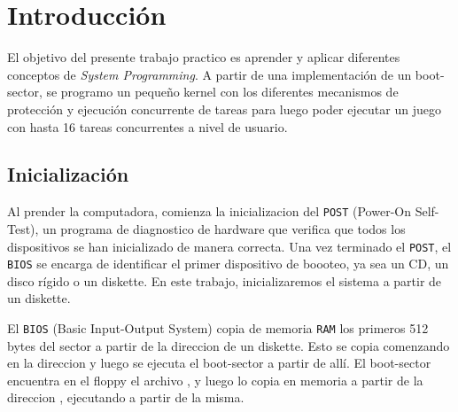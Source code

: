 \section{Introducción}

El objetivo del presente trabajo practico es aprender y aplicar diferentes conceptos de \textit{System Programming}. A partir de una implementación de un boot-sector, se programo un pequeño kernel con los diferentes mecanismos de protección y ejecución concurrente de tareas para luego poder ejecutar un juego con hasta 16 tareas concurrentes a nivel de usuario.

\subsection{Inicialización}

Al prender la computadora, comienza la inicializacion del \texttt{POST} (Power-On Self-Test), un programa de diagnostico de hardware que verifica que todos los dispositivos se han inicializado de manera correcta. Una vez terminado el \texttt{POST}, el \texttt{BIOS} se encarga de identificar el primer dispositivo de boooteo, ya sea un CD, un disco rígido o un diskette. En este trabajo, inicializaremos el sistema a partir de un diskette.

El \texttt{BIOS} (Basic Input-Output System) copia de memoria \texttt{RAM} los primeros 512 bytes del sector a partir de la direccion  de un diskette. Esto se copia comenzando en la direccion  y luego se ejecuta el boot-sector a partir de allí. El boot-sector encuentra en el floppy el archivo , y luego lo copia en memoria a partir de la direccion , ejecutando a partir de la misma.

